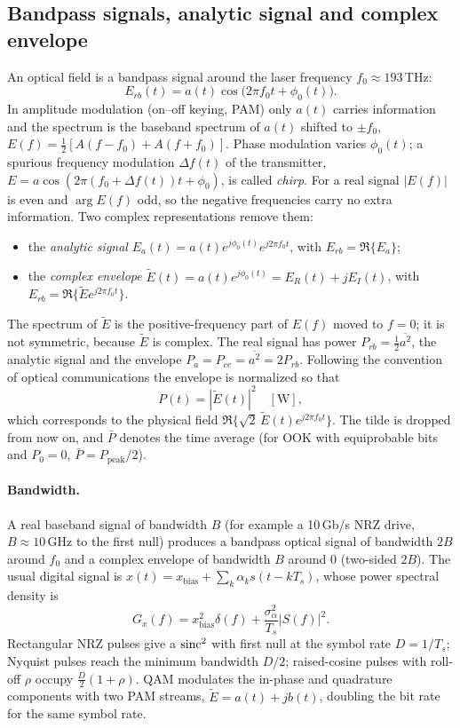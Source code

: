 \subsection{Bandpass signals, analytic signal and complex envelope}
An optical field is a bandpass signal around the laser frequency $f_0\approx193$\,THz:
\begin{equation}
  E_{rb}(t)=a(t)\cos\big(2\pi f_0t+\phi_0(t)\big).
\end{equation}
In amplitude modulation (on--off keying, PAM) only $a(t)$ carries information and the spectrum
is the baseband spectrum of $a(t)$ shifted to $\pm f_0$,
$E(f)=\frac12[A(f-f_0)+A(f+f_0)]$. Phase modulation varies $\phi_0(t)$; a spurious frequency
modulation $\Delta f(t)$ of the transmitter, $E=a\cos(2\pi(f_0+\Delta f(t))t+\phi_0)$, is called
\emph{chirp}. For a real signal $|E(f)|$ is even and $\arg E(f)$ odd, so the negative frequencies
carry no extra information. Two complex representations remove them:
\begin{itemize}
  \item the \emph{analytic signal} $E_a(t)=a(t)e^{j\phi_0(t)}e^{j2\pi f_0t}$, with $E_{rb}=\Re\{E_a\}$;
  \item the \emph{complex envelope} $\tilde E(t)=a(t)e^{j\phi_0(t)}=E_R(t)+jE_I(t)$, with
  $E_{rb}=\Re\{\tilde Ee^{j2\pi f_0t}\}$.
\end{itemize}
The spectrum of $\tilde E$ is the positive-frequency part of $E(f)$ moved to $f=0$; it is not
symmetric, because $\tilde E$ is complex. The real signal has power $P_{rb}=\frac12\overline{a^2}$, the analytic
signal and the envelope $P_a=P_{ce}=\overline{a^2}=2P_{rb}$. Following the convention of optical
communications the envelope is normalized so that
\begin{equation}
  P(t)=|\tilde E(t)|^2\quad[\mathrm W],
\end{equation}
which corresponds to the physical field $\Re\{\sqrt2\,\tilde E(t)e^{j2\pi f_0t}\}$. The tilde is dropped from
now on, and $\bar P$ denotes the time average (for OOK with equiprobable bits and $P_0=0$,
$\bar P=P_{\mathrm{peak}}/2$).

\paragraph{Bandwidth.} A real baseband signal of bandwidth $B$ (for example a 10\,Gb/s NRZ drive,
$B\approx10$\,GHz to the first null) produces a bandpass optical signal of bandwidth $2B$ around $f_0$
and a complex envelope of bandwidth $B$ around $0$ (two-sided $2B$). The usual digital signal is
$x(t)=x_{\mathrm{bias}}+\sum_k\alpha_ks(t-kT_s)$, whose power spectral density is
\begin{equation}
  G_x(f)=x_{\mathrm{bias}}^2\delta(f)+\frac{\sigma_\alpha^2}{T_s}|S(f)|^2 .
\end{equation}
Rectangular NRZ pulses give a $\operatorname{sinc}^2$ with first null at the symbol rate $D=1/T_s$; Nyquist
pulses reach the minimum bandwidth $D/2$; raised-cosine pulses with roll-off $\rho$ occupy
$\frac D2(1+\rho)$. QAM modulates the in-phase and quadrature components with two PAM streams,
$\tilde E=a(t)+jb(t)$, doubling the bit rate for the same symbol rate.


